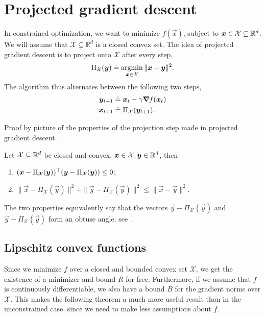 \section{Projected gradient descent}

In constrained optimization, we want to minimize $f(\vec{x})$, subject to $\bm{x}\in \mathcal{X}
    \subseteq \mathbb{R}^d$. We will assume that $\mathcal{X} \subsetneq \mathbb{R}^d$ is a closed convex set.
The idea of projected gradient descent is to project onto $\mathcal{X}$ after every step, \[
    \Pi_{\mathcal{X}}(\bm{y}) \doteq \operatorname*{argmin}_{\bm{x} \in \mathcal{X}} \| \bm{x}-\bm{y} \|^2.
\]
The algorithm thus alternates between the following two steps,
\begin{align*}
    \bm{y}_{t+1} & \doteq \bm{x}_t - \gamma \bm{\nabla}_{\! } f(\bm{x}_t) \\
    \bm{x}_{t+1} & \doteq \Pi_{\mathcal{X}}(\bm{y}_{t+1}).
\end{align*}

\begin{marginfigure}
    \centering
    \caption{Proof by picture of the properties of the projection step made in projected gradient descent.}
    \label{fig:constrained-optimization}
\end{marginfigure}

\begin{observation}
    Let $\mathcal{X} \subseteq \mathbb{R}^d$ be closed and convex, $\bm{x}\in \mathcal{X}, \bm{y}\in \mathbb{R}^d$, then
    \begin{enumerate}
        \item $(\bm{x} - \Pi_{\mathcal{X}}(\bm{y}))^\top (\bm{y} - \Pi_{\mathcal{X}}(\bm{y})) \leq 0$;
        \item $\| \vec{x} - \Pi_{\mathcal{X}}(\vec{y}) \|^2 + \| \vec{y} - \Pi_{\mathcal{X}}(\vec{y}) \|^2 \leq \|\vec{x} - \vec{y}\|^2$.
    \end{enumerate}
\end{observation}

The two properties equivalently say that the vectors $\vec{y} - \Pi_{\mathcal{X}}(\vec{y})$ and
$\vec{y} - \Pi_{\mathcal{X}}(\vec{y})$ form an obtuse angle; see
.

\subsection{Lipschitz convex functions}

Since we minimize $f$ over a closed and bounded convex set $\mathcal{X}$, we get the existence of a
minimizer and bound $R$ for free. Furthermore, if we assume that $f$ is continuously
differentiable, we also have a bound $B$ for the gradient norms over $\mathcal{X}$. This makes the
following theorem a much more useful result than in the unconstrained case, since we need to make
less assumptions about $f$.

